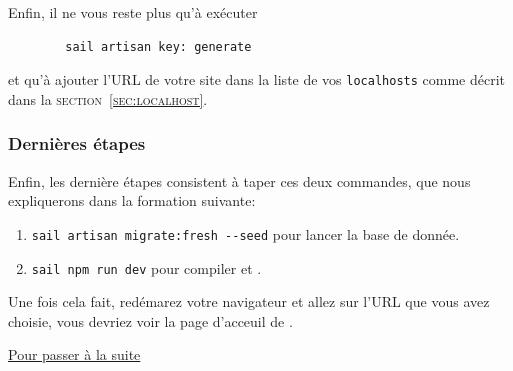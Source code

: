     Enfin, il ne vous reste plus qu'à exécuter 
    \begin{lstlisting}
        sail artisan key: generate
    \end{lstlisting}

    et qu'à ajouter l'URL de votre site dans la liste de vos \texttt{localhosts} comme décrit dans la \textsc{section~\ref{sec:localhost}}.

    \subsubsection[Dernières étapes]{Dernières étapes}
    Enfin, les dernière étapes consistent à taper ces deux commandes, que nous expliquerons dans la formation suivante:
    \begin{enumerate}
        \item \verb|sail artisan migrate:fresh --seed| pour lancer la base de donnée.
        \item \verb|sail npm run dev| pour compiler \css{} et \js{}.
    \end{enumerate}

    Une fois cela fait, redémarez votre navigateur et allez sur l'URL que vous avez choisie, vous devriez voir la page d'acceuil de \laravel{}.

    \hyperref[sec:suite]{Pour passer à la suite}
